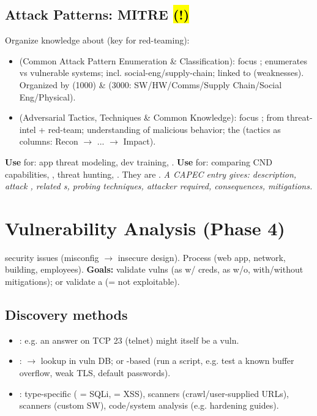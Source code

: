 \subsection{Attack Patterns: MITRE \hl{(!)}}
Organize knowledge about  (key for red-teaming):
\begin{itemize}
\item {} (Common Attack Pattern Enumeration \& Classification): focus ; enumerates  vs vulnerable systems; incl. social-eng/supply-chain; linked to  (weaknesses). Organized by  (1000) \&  (3000: SW/HW/Comms/Supply Chain/Social Eng/Physical).
\item {} (Adversarial Tactics, Techniques \& Common Knowledge): focus ; from threat-intel + red-team;  understanding of malicious behavior; the  (tactics as columns: Recon $\to$ ... $\to$ Impact).
\end{itemize}
\textbf{Use } for: app threat modeling, dev training, . \textbf{Use } for: comparing CND capabilities, , threat hunting, . They are .
\textit{A CAPEC entry gives: description, attack , related s, probing techniques, attacker  required, consequences, mitigations.}

\section{Vulnerability Analysis (Phase 4)}
 security issues (misconfig $\to$ insecure design). Process  (web app, network, building, employees).
\textbf{Goals:} validate vulns  (as  w/ creds, as  w/o, with/without mitigations); or validate a  (= not exploitable).

\subsection{Discovery methods}
\begin{itemize}
\item {}: e.g. an answer on TCP 23 (telnet) might itself be a vuln.
\item {}:  $\to$ lookup in vuln DB; or -based (run a script, e.g. test a known buffer overflow, weak TLS, default passwords).
\item {}: type-specific ( = SQLi,  = XSS),  scanners (crawl/user-supplied URLs),  scanners (custom SW),  code/system analysis (e.g.  hardening guides).
\end{itemize}

